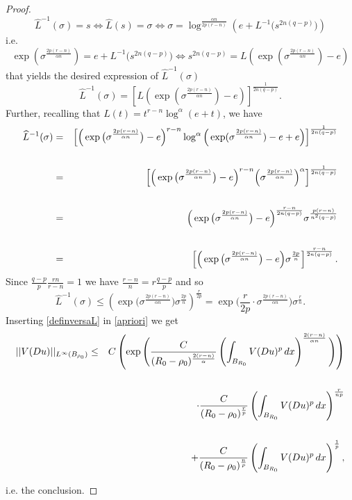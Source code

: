 \documentclass[12pt]{amsart}
\theoremstyle{definition}
\numberwithin{equation}{section}
\numberwithin{equation}{section}
\begin{document}
{\begin{proof}
$$\widehat{L}^{-1}(\sigma)=s \Longleftrightarrow\widehat{L}(s)=\sigma \Longleftrightarrow \sigma=\log^{{\frac{\alpha n}{2p(r-n)}}}\left(e+L^{-1} \Big(s^{2n(q-p)}\Big)\right)$$
i.e.
$$\exp\left(\sigma ^{{\frac{2p(r-n)}{\alpha n}}}\right)=e+L^{-1} \Big(s^{2n(q-p)}\Big)\Longleftrightarrow s^{2n(q-p)}=L\left(\exp\left(\sigma ^{{\frac{2p(r-n)}{\alpha n}}}\right)-e\right)$$
that yields the desired expression of $\widehat{L}^{-1}(\sigma)$
\begin{equation*}
\widehat{L}^{-1}(\sigma)=\left[L\left(\exp\left(\sigma ^{{\frac{2p(r-n)}{\alpha n}}}\right)-e\right)\right]^{\frac{1}{2n(q-p)}}.    
\end{equation*}
{Further, recalling that $L(t)=t^{r-n}\log^\alpha(e+t)$, we have
\begin{eqnarray*}
\widehat{L}^{-1}(\sigma)&=& \Big[\Big(\exp\big(\sigma^{\frac{2p(r-n)}{\alpha n}}\big)-e\Big)^{r-n}\log^\alpha\Big(\exp(\sigma^{\frac{2p(r-n)}{\alpha n}})-e+e\Big)\Big]^{\frac{1}{2n(q-p)}} \cr\cr 
&=& \Big[\Big(\exp\big(\sigma^{\frac{2p(r-n)}{\alpha n}}\big)-e\Big)^{r-n}\Big(\sigma^{\frac{2p(r-n)}{\alpha n}}\Big)^\alpha\Big]^{\frac{1}{2n(q-p)}}\cr\cr
&=&\Big(\exp\big(\sigma^{\frac{2p(r-n)}{\alpha n}}\big)-e\Big)^{\frac{r-n}{2n(q-p)}}\sigma^{\frac{p(r-n)}{n^2(q-p)}}\cr\cr
&=&\left[\Big(\exp\big(\sigma^{\frac{2p(r-n)}{\alpha n}}\big)-e\Big)\sigma^{\frac{2p}{n}}\right]^{\frac{r-n}{2n(q-p)}}.
\end{eqnarray*}
Since $\frac{q-p}{p}\frac{rn}{r-n}=1$  we have $\frac{r-n}{n}=r\frac{q-p}{p}$ and so
\begin{equation}\label{definversaL}
    \widehat{L}^{-1}(\sigma)\le\left(\exp\Big(\sigma^{\frac{2p(r-n)}{\alpha n}}\Big)\sigma^{\frac{2p}{n}}\right)^{\frac{r}{2p}}=\exp\Big(\frac{r}{2p}\cdot\sigma^{\frac{2p(r-n)}{\alpha n}}\Big)\sigma^{\frac{r}{n}}.\end{equation}}
Inserting \eqref{definversaL} in \eqref{apriori} we get
{\begin{eqnarray*}\label{apriorifin}
	||V(Du)||_{L^{\infty}(B_{\rho_0})} &\le&   C\left(\exp\Bigg(\frac{C}{( R_0- \rho_0 )^{\frac{2(r-n)}{\alpha }}}\left(\int_{B_{ R_0}}V(Du)^{p}
\, dx\right)^{\frac{2(r-n)}{\alpha n}}\Bigg)\right)\cr\cr
&&\quad\cdot \frac{C}{(R_0-\rho_0 )^{\frac{r}{p}}}  \left(\int_{B_{R_0}}V(Du)^{p}
\, dx\right)^{\frac{r}{np}}\cr\cr
&&\qquad+ \frac{C}{(R_0-\rho_0 )^{\frac{n}{p}}}  \left(\int_{B_{R_0}}V(Du)^{p}
\, dx\right)^{\frac{1}{p}},
\end{eqnarray*}}

i.e. the conclusion.
 \end{proof}
}
\end{document}
